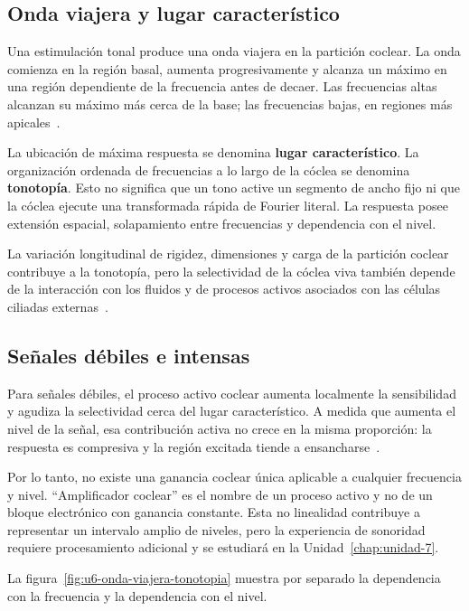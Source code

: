 \subsection{Onda viajera y lugar característico}
\label{sec:u6-onda-viajera}

Una estimulación tonal produce una onda viajera en la partición
coclear. La onda comienza en la región basal, aumenta progresivamente y
alcanza un máximo en una región dependiente de la frecuencia antes de
decaer. Las frecuencias altas alcanzan su máximo más cerca de la base; las
frecuencias bajas, en regiones más apicales~\cite{fettiplace2017,capraraPeng2022}.

La ubicación de máxima respuesta se denomina \textbf{lugar característico}.
La organización ordenada de frecuencias a lo largo de la cóclea se denomina
\textbf{tonotopía}. Esto no significa que un tono active un segmento de ancho
fijo ni que la cóclea ejecute una transformada rápida de Fourier literal. La
respuesta posee extensión espacial, solapamiento entre frecuencias y
dependencia con el nivel.

La variación longitudinal de rigidez, dimensiones y carga de la
partición coclear contribuye a la tonotopía, pero la selectividad de la cóclea
viva también depende de la interacción con los fluidos y de procesos activos
asociados con las células ciliadas externas~\cite{fettiplace2017,capraraPeng2022}.

\subsection{Señales débiles e intensas}
\label{sec:u6-debiles-intensas}

Para señales débiles, el proceso activo coclear aumenta localmente la
sensibilidad y agudiza la selectividad cerca del lugar característico. A
medida que aumenta el nivel de la señal, esa contribución activa no crece en
la misma proporción: la respuesta es compresiva y la región excitada tiende a
ensancharse~\cite{fettiplace2017,capraraPeng2022}.

Por lo tanto, no existe una ganancia coclear única aplicable a cualquier
frecuencia y nivel. ``Amplificador coclear'' es el nombre de un proceso activo
y no de un bloque electrónico con ganancia constante. Esta no linealidad
contribuye a representar un intervalo amplio de niveles, pero la experiencia
de sonoridad requiere procesamiento adicional y se estudiará en la
Unidad~\ref{chap:unidad-7}.

La figura~\ref{fig:u6-onda-viajera-tonotopia} muestra por separado la
dependencia con la frecuencia y la dependencia con el nivel.

